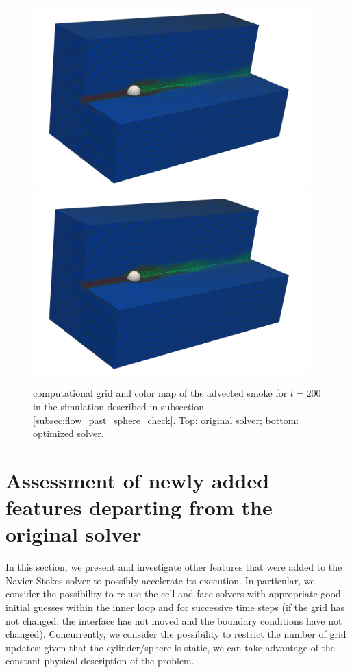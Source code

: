 \documentclass[11pt, a4paper]{article}
\theoremstyle{remark}
\begin{document}
\begin{figure}
  \centering
  \includegraphics[width=0.95\textwidth]{./figures/flow_past_sphere/check_unchanged_behavior/original_grid_and_smoke_t_is_200.pdf} \\ 
  \includegraphics[width=0.95\textwidth]{./figures/flow_past_sphere/check_unchanged_behavior/optimized_grid_and_smoke_t_is_200.pdf}
 \caption{\label{fig:grid_and_smoke_flow_past_sphere_check_unchanged} computational grid and color map of the advected smoke for $t = 200$ in the simulation described in subsection \ref{subsec:flow_past_sphere_check}. Top: original solver; bottom: optimized solver.}
\end{figure}

\section{Assessment of newly added features departing from the original solver}
In this section, we present and investigate other features that were added to the Navier-Stokes solver to possibly accelerate its execution. In particular, we consider the possibility to re-use the cell and face solvers with appropriate good initial guesses within the inner loop and for successive time steps (if the grid has not changed, the interface has not moved and the boundary conditions have not changed). Concurrently, we consider the possibility to restrict the number of grid updates: given that the cylinder/sphere is static, we can take advantage of the constant physical description of the problem. 
\end{document}
